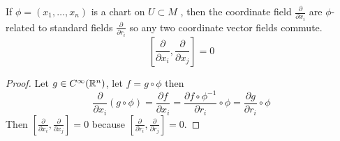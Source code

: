 \begin{teorema}
If $\phi= (x_1,\ldots,x_n)$ is a chart on $U\subset M$ , then the coordinate field $\frac{\partial}{\partial x_i}  $ are $\phi$-related to standard fields $\frac{\partial}{\partial r_i} $ so any two coordinate vector fields commute.
$$\left[ \frac{\partial}{\partial x_i}, \frac{\partial}{\partial x_j}  \right]=0$$
\begin{proof}
Let $g\in C^\infty(\mathbb{R}^n)$, let $f=g\circ \phi$ then 
$$\frac{\partial}{\partial x_i} (g\circ\phi)=\frac{\partial f}{\partial x_i} = \frac{\partial f\circ \phi^{-1} }{\partial r_i} \circ \phi = \frac{\partial g}{\partial r_i} \circ \phi$$
Then $[\frac{\partial}{\partial x_i} , \frac{\partial}{\partial x_j}] = 0 $ because $[\frac{\partial}{\partial r_i} , \frac{\partial}{\partial r_j}] = 0$.
\end{proof}
\end{teorema}

